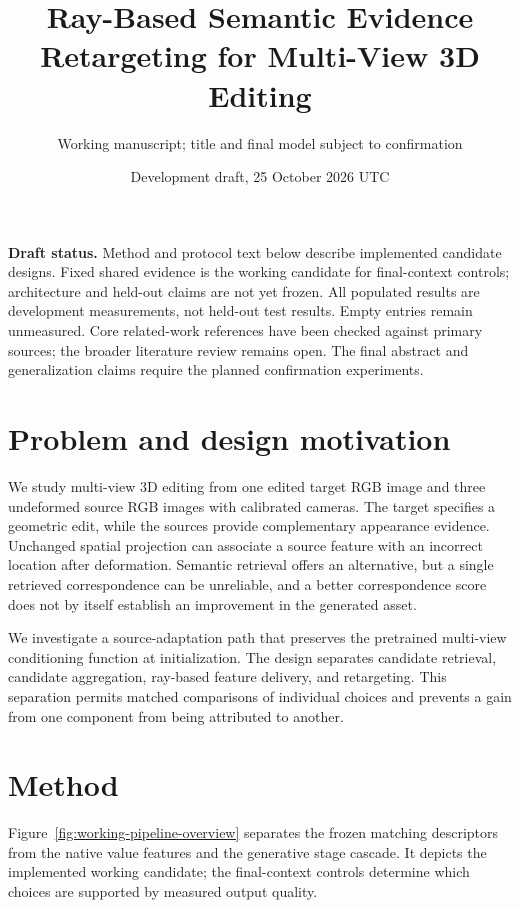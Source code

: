 \documentclass[10pt]{article}
\title{Ray-Based Semantic Evidence Retargeting for Multi-View 3D Editing}
\author{Working manuscript; title and final model subject to confirmation}
\date{Development draft, 25 October 2026 UTC}
\begin{document}
\maketitle

\noindent\textbf{Draft status.} Method and protocol text below describe implemented
candidate designs. Fixed shared evidence is the working candidate for
final-context controls; architecture and held-out claims are not yet frozen. All populated
results are development measurements, not held-out test results. Empty entries
remain unmeasured. Core related-work references have been checked against
primary sources; the broader literature review remains open. The final
abstract and generalization claims require the planned confirmation experiments.

\section{Problem and design motivation}
We study multi-view 3D editing from one edited target RGB image and three
undeformed source RGB images with calibrated cameras. The target specifies a
geometric edit, while the sources provide complementary appearance evidence.
Unchanged spatial projection can associate a source feature with an incorrect
location after deformation. Semantic retrieval offers an alternative, but a
single retrieved correspondence can be unreliable, and a better correspondence
score does not by itself establish an improvement in the generated asset.

We investigate a source-adaptation path that preserves the pretrained
multi-view conditioning function at initialization. The design separates
candidate retrieval, candidate aggregation, ray-based feature delivery, and
retargeting. This separation permits matched comparisons of individual choices
and prevents a gain from one component from being attributed to another.



\section{Method}
Figure~\ref{fig:working-pipeline-overview} separates the frozen matching
descriptors from the native value features and the generative stage cascade.
It depicts the implemented working candidate; the final-context controls
determine which choices are supported by measured output quality.

\end{document}

